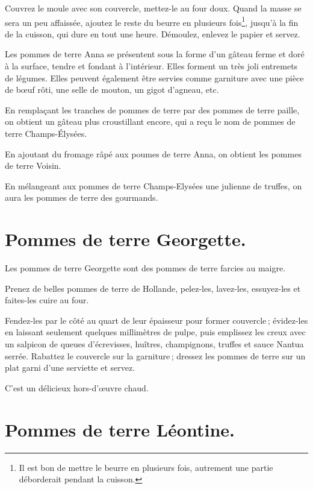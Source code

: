 Couvrez le moule avec son couvercle, mettez-le au four doux. Quand la masse se
sera un peu affaissée, ajoutez le reste du beurre en plusieurs fois\footnote{Il
est bon de mettre le beurre en plusieurs fois, autrement une partie déborderait
pendant la cuisson.}, jusqu'à la fin de la cuisson, qui dure en tout une heure.
Démoulez, enlevez le papier et servez.

\medskip

Les pommes de terre Anna se présentent sous la forme d'un gâteau ferme et doré
à la surface, tendre et fondant à l'intérieur. Elles forment un très joli
entremets de légumes. Elles peuvent également être servies comme garniture avec
une pièce de bœuf rôti, une selle de mouton, un gigot d'agneau, etc.

\sk

En remplaçant les tranches de pommes de terre par des pommes de terre paille,
on obtient un gâteau plus croustillant encore, qui a reçu le nom de pommes de
terre Champs-Élysées.

\sk

En ajoutant du fromage râpé aux poumes de terre Anna, on obtient les pommes de
terre Voisin.

\sk

En mélangeant aux pommes de terre Champs-Elysées une julienne de truffes, on
aura les pommes de terre des gourmands.

\section*{\centering Pommes de terre Georgette.}
{}

Les pommes de terre Georgette sont des pommes de terre farcies au maigre.

Prenez de belles pommes de terre de Hollande, pelez-les, lavez-les, essuyez-les
et faites-les cuire au four.

Fendez-les par le côté au quart de leur épaisseur pour former couvercle ;
évidez-les en laissant seulement quelques millimètres de pulpe, puis emplissez
les creux avec un salpicon de queues d'écrevisses, huîtres, champignons,
truffes et sauce Nantua serrée. Rabattez le couvercle sur la garniture ;
dressez les pommes de terre sur un plat garni d'une serviette et servez.

C'est un délicieux hors-d'œuvre chaud.

\section*{\centering Pommes de terre Léontine.}
{}

